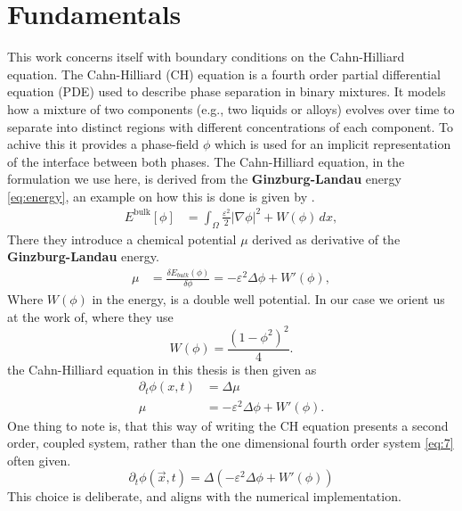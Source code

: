 \documentclass{mimosis}
\begin{document}
\chapter{Fundamentals}
\label{sec:org8492d40}
This work concerns itself with boundary conditions on the Cahn-Hilliard equation. The Cahn-Hilliard (CH) equation is a fourth order partial differential equation (PDE) used to describe phase separation in binary mixtures. It models how a mixture of two components (e.g., two liquids or alloys) evolves over time to separate into distinct regions with different concentrations of each component. To achive this it provides a phase-field \(\phi\) which is used for an implicit representation of the interface between both phases. The Cahn-Hilliard equation, in the formulation we use here, is derived from the \textbf{Ginzburg-Landau} energy \eqref{eq:energy}, an example on how this is done is given by \autocite{Wu_2022}.
\begin{align}
\label{eq:energy}
E^{\text{bulk}}[\phi] &= \int_{\Omega} \frac{\varepsilon^2}{2} |\nabla \phi |^2 + W(\phi) \, dx ,
\end{align}
There they introduce a chemical potential \(\mu\) derived as derivative of the \textbf{Ginzburg-Landau} energy.
\begin{align}
\label{eq:chemical-potential}
 \mu &= \frac{\delta E_{bulk}(\phi)}{\delta \phi} = -\varepsilon^2 \Delta \phi + W'(\phi),
\end{align}
Where \(W(\phi)\) in the energy, is a double well potential. In our case we orient us at the work of\autocite{SHIN20117441}, where they use
\begin{equation}
\label{eq:6}
W(\phi) = \frac{(1-\phi^2)^2}{4}.
\end{equation}
the Cahn-Hilliard equation in this thesis is then given as
\begin{equation}
\begin{aligned}
\partial_{t}\phi(x,t) &=  \Delta\mu \\
\mu &= - \varepsilon^2 \Delta\phi  + W'(\phi).
\end{aligned}
\end{equation}
One thing to note is, that this way of writing the CH equation presents a second order, coupled system, rather than the one dimensional fourth order system \eqref{eq:7} often given.
\begin{equation}
\label{eq:7}
\partial_t \phi(\vec{x} , t) = \Delta(-\varepsilon^2  \Delta \phi + W\prime(\phi))
\end{equation}
This choice is deliberate, and aligns with the numerical implementation.
\end{document}
